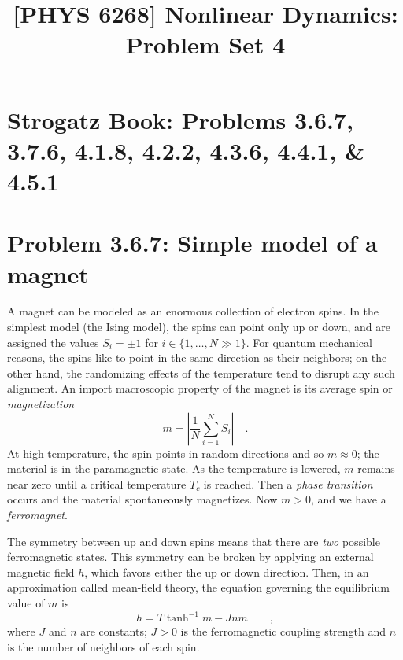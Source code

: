 \documentclass[draft]{agujournal2019}
\begin{document}
\SetSinglespace{}
\title{[PHYS 6268] Nonlinear Dynamics: Problem Set 4}




\section*{Strogatz Book: Problems 3.6.7, 3.7.6, 4.1.8, 4.2.2, 4.3.6, 4.4.1, \& 4.5.1}


\section{Problem 3.6.7: Simple model of a magnet}
\label{sec:p1}

A magnet can be modeled as an enormous collection of electron spins. In the simplest model (the Ising model), the spins can point only up or down, and are assigned the values $S_i=\pm1$ for $i\in\{
1,\dots,N\gg1\}$. For quantum mechanical reasons, the spins like to point in the same direction as their neighbors; on the other hand, the randomizing effects of the temperature tend to disrupt any such alignment. An import macroscopic property of the magnet is its average spin or \emph{magnetization}
\begin{equation*}
    m = \left|\frac{1}{N}\sum_{i=1}^N S_i \right|  \quad .
\end{equation*}
At high temperature, the spin points in random directions and so $m\approx0$; the material is in the paramagnetic state. As the temperature is lowered, $m$ remains near zero until a critical temperature $T_c$ is reached. Then a \emph{phase transition} occurs and the material spontaneously magnetizes. Now $m>0$, and we have a \emph{ferromagnet}. 
\par
The symmetry between up and down spins means that there are \emph{two} possible ferromagnetic states. This symmetry can be broken by applying an external magnetic field $h$, which favors either the up or down direction. Then, in an approximation called mean-field theory, the equation governing the equilibrium value of $m$ is 
\begin{equation*}
    h = T\tanh^{-1}{m} - Jnm \qquad ,
\end{equation*}
where $J$ and $n$ are constants; $J>0$ is the ferromagnetic coupling strength and $n$ is the number of neighbors of each spin.
\end{document}

